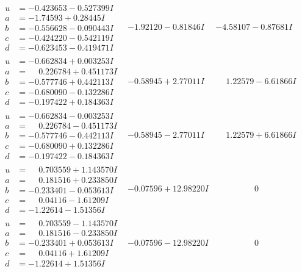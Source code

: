 \documentclass[1p]{elsarticle_modified}
\theoremstyle{definition}
\begin{document}
$$\begin{array}{c|c|c}
\begin{aligned}
u &= -0.423653 - 0.527399 I \\
a &= -1.74593 + 0.28445 I \\
b &= -0.556628 - 0.090443 I \\
c &= -0.424220 - 0.542119 I \\
d &= -0.623453 - 0.419471 I\end{aligned}
 & -1.92120 - 0.81846 I & -4.58107 - 0.87681 I \\ \hline\begin{aligned}
u &= -0.662834 + 0.003253 I \\
a &= \phantom{-}0.226784 + 0.451173 I \\
b &= -0.577746 + 0.442113 I \\
c &= -0.680090 - 0.132286 I \\
d &= -0.197422 + 0.184363 I\end{aligned}
 & -0.58945 + 2.77011 I & \phantom{-}1.22579 - 6.61866 I \\ \hline\begin{aligned}
u &= -0.662834 - 0.003253 I \\
a &= \phantom{-}0.226784 - 0.451173 I \\
b &= -0.577746 - 0.442113 I \\
c &= -0.680090 + 0.132286 I \\
d &= -0.197422 - 0.184363 I\end{aligned}
 & -0.58945 - 2.77011 I & \phantom{-}1.22579 + 6.61866 I \\ \hline\begin{aligned}
u &= \phantom{-}0.703559 + 1.143570 I \\
a &= \phantom{-}0.181516 + 0.233850 I \\
b &= -0.233401 - 0.053613 I \\
c &= \phantom{-}0.04116 - 1.61209 I \\
d &= -1.22614 - 1.51356 I\end{aligned}
 & -0.07596 + 12.98220 I & \phantom{-0.000000 } 0 \\ \hline\begin{aligned}
u &= \phantom{-}0.703559 - 1.143570 I \\
a &= \phantom{-}0.181516 - 0.233850 I \\
b &= -0.233401 + 0.053613 I \\
c &= \phantom{-}0.04116 + 1.61209 I \\
d &= -1.22614 + 1.51356 I\end{aligned}
 & -0.07596 - 12.98220 I & \phantom{-0.000000 } 0\\

\end{array}$$
\end{document}
